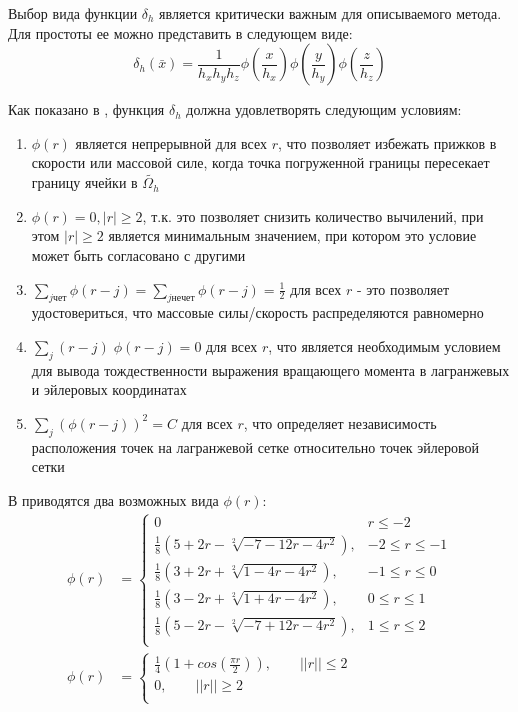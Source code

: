 Выбор вида функции $\delta_h$ является критически важным для описываемого метода. Для простоты ее можно представить в следующем виде:
\begin{equation}
    \delta_h (\bar{x}) = \frac{1}{h_x h_y h_z}
    \phi \left( \frac{x}{h_x} \right)
    \phi \left( \frac{y}{h_y} \right)
    \phi \left( \frac{z}{h_z} \right)
\end{equation}

Как показано в \cite{peskin2002immersed}, функция $\delta_h$ должна удовлетворять следующим условиям:
\begin{enumerate}
    \item \label{item:delta_conditions:first} $\phi(r)$ является непрерывной для всех $r$, что позволяет избежать прижков в скорости или массовой силе,
        когда точка погруженной границы пересекает границу ячейки в $\tilde{\Omega_h}$
    \item \label{item:delta_conditions:second} $\phi(r) = 0, |r| \geq 2$, т.к. это позволяет снизить количество вычилений, при этом $|r| \geq 2$
        является минимальным значением, при котором это условие может быть согласовано с другими
    \item \label{item:delta_conditions:third} $\sum_{j чет} \phi(r - j) = \sum_{j нечет} \phi(r - j) = \frac{1}{2}$ для всех $r$ - это позволяет
        удостовериться, что массовые силы/скорость распределяются равномерно
    \item \label{item:delta_conditions:fourth} $\sum_{j} (r - j)\; \phi(r - j) = 0$ для всех $r$, что является необходимым условием для вывода тождественности
        выражения вращающего момента в лагранжевых и эйлеровых координатах
    \item \label{item:delta_conditions:fifth} $\sum_{j} (\phi(r - j))^2 = C$ для всех $r$, что определяет независимость расположения точек на лагранжевой сетке
        относительно точек эйлеровой сетки
\end{enumerate}
В \cite{peskin2002immersed} приводятся два возможных вида $\phi(r)$:
\begin{align}
    \label{eq:delta_new}
    \phi(r) &= 
        \begin{cases}
            0 & r \leq -2\\
            \frac{1}{8} \left( 5 + 2r - \sqrt[2]{-7 - 12r -4r^2} \right), & -2 \leq r \leq -1\\
            \frac{1}{8} \left( 3 + 2r + \sqrt[2]{1 - 4r -4r^2} \right), & -1 \leq r \leq 0\\
            \frac{1}{8} \left( 3 - 2r + \sqrt[2]{1 + 4r -4r^2} \right), & 0 \leq r \leq 1\\
            \frac{1}{8} \left( 5 - 2r - \sqrt[2]{-7 + 12r -4r^2} \right), & 1 \leq r \leq 2\\
        \end{cases}
    \\
    \label{eq:delta_old}
    \phi(r) &= 
        \begin{cases}
            \frac{1}{4} \left( 1 + cos\left( \frac{\pi r}{2} \right) \right),\qquad ||r|| \leq 2\\
            0 ,\qquad ||r|| \geq 2\\
        \end{cases}
\end{align}
